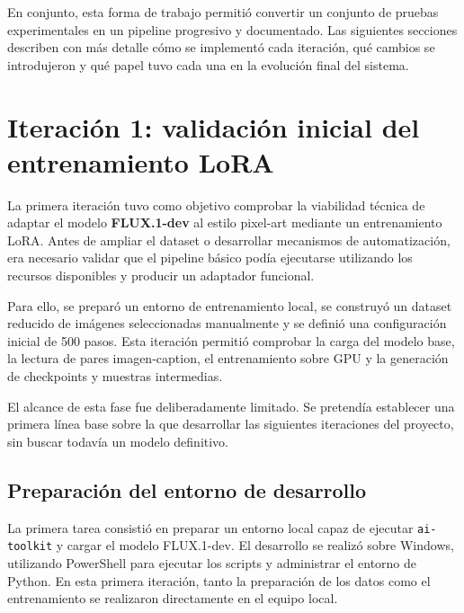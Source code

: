 \documentclass[a4paper,11pt,titlepage]{scrbook}
\begin{document}
\medskip

En conjunto, esta forma de trabajo permitió convertir un conjunto de pruebas experimentales en un pipeline progresivo y documentado. Las siguientes secciones describen con más detalle cómo se implementó cada iteración, qué cambios se introdujeron y qué papel tuvo cada una en la evolución final del sistema.


\section{Iteración 1: validación inicial del entrenamiento LoRA}
\label{sec:iteracion_1}

La primera iteración tuvo como objetivo comprobar la viabilidad técnica de adaptar el modelo \textbf{FLUX.1-dev} al estilo pixel-art mediante un entrenamiento LoRA. Antes de ampliar el dataset o desarrollar mecanismos de automatización, era necesario validar que el pipeline básico podía ejecutarse utilizando los recursos disponibles y producir un adaptador funcional.

\medskip

Para ello, se preparó un entorno de entrenamiento local, se construyó un dataset reducido de imágenes seleccionadas manualmente y se definió una configuración inicial de 500 pasos. Esta iteración permitió comprobar la carga del modelo base, la lectura de pares imagen-caption, el entrenamiento sobre GPU y la generación de checkpoints y muestras intermedias.

\medskip

El alcance de esta fase fue deliberadamente limitado. Se pretendía establecer una primera línea base sobre la que desarrollar las siguientes iteraciones del proyecto, sin buscar todavía un modelo definitivo.

\subsection{Preparación del entorno de desarrollo}
\label{subsec:entorno_iteracion_1}

La primera tarea consistió en preparar un entorno local capaz de ejecutar \texttt{ai-toolkit} y cargar el modelo FLUX.1-dev. El desarrollo se realizó sobre Windows, utilizando PowerShell para ejecutar los scripts y administrar el entorno de Python. En esta primera iteración, tanto la preparación de los datos como el entrenamiento se realizaron directamente en el equipo local.

\medskip
\end{document}

